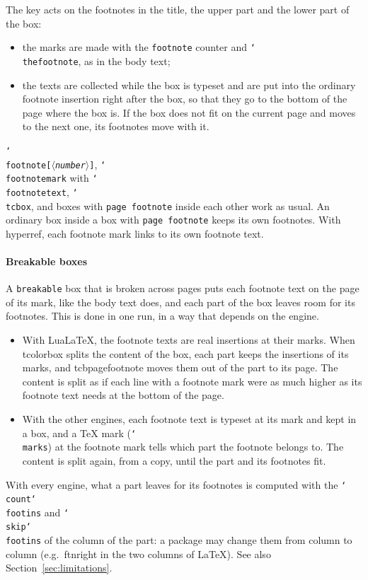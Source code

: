 \documentclass{article}
\newcommand*\cs[1]{\texttt{\char`\\#1}}
\newcommand*\pkg[1]{\textsf{#1}}
\newcommand*\key[1]{\texttt{#1}}
\newcommand*\meta[1]{$\langle$\textit{#1}$\rangle$}
\begin{document}
\noindent
The key acts on the footnotes in the title, the upper part and the lower
part of the box:
\begin{itemize}
\item the marks are made with the \texttt{footnote} counter and
  \cs{thefootnote}, as in the body text;
\item the texts are collected while the box is typeset and are put into
  the ordinary footnote insertion right after the box, so that they go
  to the bottom of the page where the box is.  If the box does not fit
  on the current page and moves to the next one, its footnotes move
  with it.
\end{itemize}
\cs{footnote}\texttt{[\meta{number}]}, \cs{footnotemark} with
\cs{footnotetext}, \cs{tcbox}, and boxes with \key{page footnote} inside
each other work as usual.  An ordinary box inside a box with
\key{page footnote} keeps its own footnotes.  With \pkg{hyperref}, each
footnote mark links to its own footnote text.

\paragraph{Breakable boxes}
A \key{breakable} box that is broken across pages puts each footnote
text on the page of its mark, like the body text does, and each part of
the box leaves room for its footnotes.  This is done in one run, in a
way that depends on the engine.
\begin{itemize}
\item With Lua\LaTeX, the footnote texts are real insertions at their
  marks.  When \pkg{tcolorbox} splits the content of the box, each part
  keeps the insertions of its marks, and \pkg{tcbpagefootnote} moves
  them out of the part to its page.  The content is split as if each
  line with a footnote mark were as much higher as its footnote text
  needs at the bottom of the page.
\item With the other engines, each footnote text is typeset at its mark
  and kept in a box, and a \TeX{} mark (\cs{marks}) at the footnote
  mark tells which part the footnote belongs to.  The content is split
  again, from a copy, until the part and its footnotes fit.
\end{itemize}
With every engine, what a part leaves for its footnotes is computed
with the \cs{count}\cs{footins} and \cs{skip}\cs{footins} of the column
of the part: a package may change them from column to column (e.g.\
\pkg{ftnright} in the two columns of \LaTeX).
See also Section~\ref{sec:limitations}.
\end{document}
